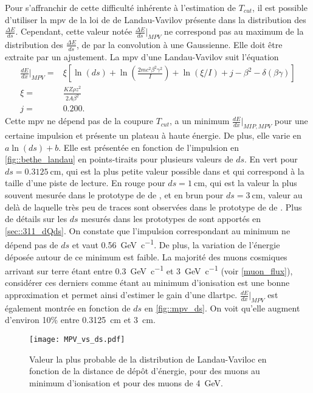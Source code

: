         Pour s'affranchir de cette difficulté inhérente à l'estimation de $T_{cut}$, il est possible d'utiliser la \gls{mpv} de la loi de de Landau-Vavilov présente dans la distribution des $\frac{\Delta E}{ds}$. Cependant, cette valeur notée $\frac{\Delta E}{ds}\rvert_{MPV}$ ne correspond pas au maximum de la distribution des $\frac{\Delta E}{ds}$, de par la convolution à une Gaussienne. Elle doit être extraite par un ajustement. La \gls{mpv} d'une Landau-Vavilov suit l'équation\cite{pdg2018}
        \begin{eqnarray}
          \frac{dE}{dx}\biggr\rvert_{MPV} = & \xi\left[\ln(ds) + \ln\left(\frac{2mc^2\beta^2\gamma^2}{I}\right)+\ln(\xi/I)+j-\beta^2 - \delta(\beta\gamma)\right] \label{eq::mpv} \\
          \xi = & \frac{KZ\rho z^2}{2A\beta^2}\nonumber\\
          j = & 0.200.\nonumber
        \end{eqnarray}
        Cette \gls{mpv} ne dépend pas de la coupure $T_{cut}$, a un minimum $\frac{dE}{dx}\biggr\rvert_{MIP,MPV}$ pour une certaine impulsion et présente un plateau à haute énergie. De plus, elle varie en $a\ln(ds)+b$. Elle est présentée en fonction de l'impulsion en \autoref{fig::bethe_landau} en points-tiraits pour plusieurs valeurs de $ds$. En vert pour $ds=\SI{0.3125}{\centi\meter}$, qui est la plus petite valeur possible dans \protodp{} et qui correspond à la taille d'une piste de lecture. En rouge pour $ds=\SI{1}{\centi\meter}$, qui est la valeur la plus souvent mesurée dans le prototype de \TOO{} de \protodp{}, et en brun pour $ds=\SI{3}{\centi\meter}$, valeur au delà de laquelle très peu de traces sont observées dans le prototype de \TOO{} de \protodp{}. Plus de détails sur les $ds$ mesurés dans les prototypes de \protodp{} sont apportés en \autoref{sec::311_dQds}. On constate que l'impulsion correspondant au minimum ne dépend pas de $ds$ et vaut \SI{0.56}{\giga\eV\per c}. De plus, la variation de l'énergie déposée autour de ce minimum est faible. La majorité des muons cosmiques arrivant sur terre étant entre \SI{0.3}{\giga\eV\per c} et \SI{3}{\giga\eV\per c} (voir \autoref{muon_flux}), considérer ces derniers comme étant au minimum d'ionisation est une bonne approximation et permet ainsi d'estimer le gain d'une \gls{dlartpc}. $\frac{dE}{dx}\rvert_{MPV}$ est également montrée en fonction de $ds$ en \autoref{fig::mpv_ds}. On voit qu'elle augment d'environ 10\;\% entre \SI{0.3125}{\centi\meter} et \SI{3}{\centi\meter}.

        \begin{figure}[htbp]
          \centering
          \texttt{[image: MPV\_vs\_ds.pdf]}
          \caption[Valeur la plus probable de la distribution de Landau-Vavilov en fonction de la distance de dépôt d'énergie.]{\label{fig::mpv_ds}Valeur la plus probable de la distribution de Landau-Vaviloc en fonction de la distance de dépôt d'énergie, pour des muons au minimum d'ionisation et pour des muons de \SI{4}{\giga\electronvolt}.}
        \end{figure}

